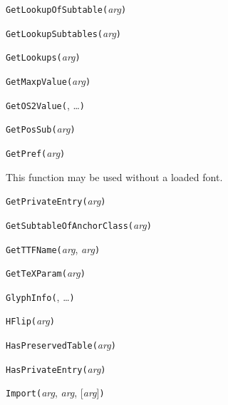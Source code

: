 \noindent\texttt{GetLookupOfSubtable(}\textit{arg}\texttt{)}


\noindent\texttt{GetLookupSubtables(}\textit{arg}\texttt{)}


\noindent\texttt{GetLookups(}\textit{arg}\texttt{)}


\noindent\texttt{GetMaxpValue(}\textit{arg}\texttt{)}


\noindent\texttt{GetOS2Value(}, \ldots\texttt{)}


\noindent\texttt{GetPosSub(}\textit{arg}\texttt{)}


\noindent\texttt{GetPref(}\textit{arg}\texttt{)}

This function may be used without a loaded font.


\noindent\texttt{GetPrivateEntry(}\textit{arg}\texttt{)}


\noindent\texttt{GetSubtableOfAnchorClass(}\textit{arg}\texttt{)}


\noindent\texttt{GetTTFName(}\textit{arg}, \textit{arg}\texttt{)}


\noindent\texttt{GetTeXParam(}\textit{arg}\texttt{)}


\noindent\texttt{GlyphInfo(}, \ldots\texttt{)}


\noindent\texttt{HFlip(}\textit{arg}\texttt{)}


\noindent\texttt{HasPreservedTable(}\textit{arg}\texttt{)}


\noindent\texttt{HasPrivateEntry(}\textit{arg}\texttt{)}


\noindent\texttt{Import(}\textit{arg}, \textit{arg}, [\textit{arg}]\texttt{)}

